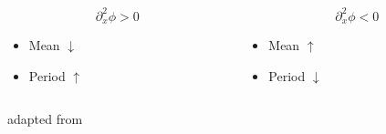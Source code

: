 \documentclass[
 ]{beamer}%
\begin{document}
\begin{frame}
\begin{columns}
\begin{column}{0.4\textwidth}
            \begin{columns}
                \begin{column}{0.4\textwidth}
                    \begin{equation*}
                        \partial_x^2\phi>0
                    \end{equation*}
                    \begin{itemize}
                        \vspace{-0.65cm}
                        \item Mean $\downarrow$
                        \item Period $\uparrow$
                    \end{itemize}
                \end{column}
                \begin{column}{0.4\textwidth}
                    \begin{equation*}
                        \partial_x^2\phi<0
                    \end{equation*}
                    \begin{itemize}
                        \vspace{-0.65cm}
                        \item Mean $\uparrow$
                        \item Period $\downarrow$
                    \end{itemize}
                \end{column}
            \end{columns}
            \vspace{1.2cm}
            \raggedleft
            \scriptsize adapted from \cite{Morgan2019}
        \end{column}
    \end{columns}
\end{frame}


            
            
\end{document}
